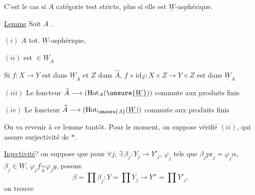 C'est le cas si $A$ catégorie test stricte, plus  si elle est  $\underline W$-asphérique.

\uline{Lemme}  Soit $A$  . 

$(i)$ $A$  tot. $\underline W$-asphérique, 

$(ii)$  est $\in\underline W_A$

 Si $f:X\longrightarrow Y$  est dans $\underline W_A$ et $Z$ dans $\widehat A$, $f\times\mathrm{id}_Z:X\times Z\longrightarrow Y\times Z$ est dans $\underline W_A$

$(iii)$ Le foncteur $\widehat A\longrightarrow(\mathrm{Hot}_A(\unsure{\underline W}))$ commute aux produits finis

$(iv)$ Le foncteur $\widehat A\longrightarrow(\mathrm{Hot}_{\unsure{A}}(\underline W))$ commute aux produits finis


On va revenir à ce lemme tantôt. Pour le moment, on suppose vérifié $(ii)$, qui assure surjectivité de $*$.

\uline{Injectivité}?
on suppose que pour $\forall j$, $\exists\,\beta_j:Y_j\longrightarrow Y'_j$, $\varphi_j$ tels que $\beta_j\mathrm{pr}_j=\varphi_j\alpha$, $\beta_j\in\underline W$, $\varphi_jf\underset h\sim\varphi_jg$,
 posons
\[
\beta=\prod\beta_j:Y=\prod Y_j\longrightarrow Y''=\prod Y'_j,
\]
 on trouve
